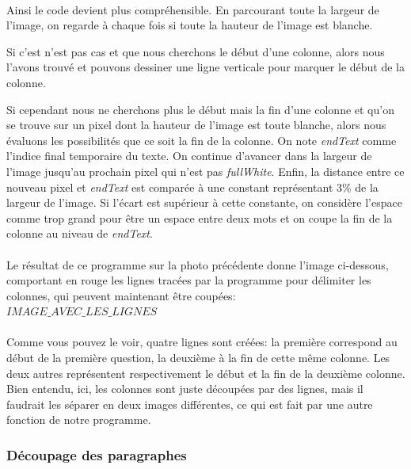 \documentclass{article}
\begin{document}
	\paragraph{}
	Ainsi le code devient plus compréhensible. En parcourant toute la largeur de l'image, on regarde à chaque fois si toute la hauteur de l'image est blanche. 
	\par
	Si c'est n'est pas cas et que nous cherchons le début d'une colonne, alors nous l'avons trouvé et pouvons dessiner une ligne verticale pour marquer le début de la colonne.
	\par
	Si cependant nous ne cherchons plus le début mais la fin d'une colonne et qu'on se trouve sur un pixel dont la hauteur de l'image est toute blanche, alors nous évaluons les possibilités que ce soit la fin de la colonne. On note \textit{endText} comme l'indice final temporaire du texte. On continue d'avancer dans la largeur de l'image jusqu'au prochain pixel qui n'est pas \textit{fullWhite}. Enfin, la distance entre ce nouveau pixel et \textit{endText} est comparée à une constant représentant 3\% de la largeur de l'image. Si l'écart est supérieur à cette constante, on considère l'espace comme trop grand pour être un espace entre deux mots et on coupe la fin de la colonne au niveau de \textit{endText}. \\
	
	\paragraph{}
	Le résultat de ce programme sur la photo précédente donne l'image ci-dessous, comportant en rouge les lignes tracées par la programme pour délimiter les colonnes, qui peuvent maintenant être coupées: \\
	
	$IMAGE\_AVEC\_LES\_LIGNES$
	
	\paragraph{}
	Comme vous pouvez le voir, quatre lignes sont créées: la première correspond au début de la première question, la deuxième à la fin de cette même colonne. Les deux autres représentent respectivement le début et la fin de la deuxième colonne. Bien entendu, ici, les colonnes sont juste découpées par des lignes, mais il faudrait les séparer en deux images différentes, ce qui est fait par une autre fonction de notre programme.
	
	\subsubsection{Découpage des paragraphes}
\end{document}
